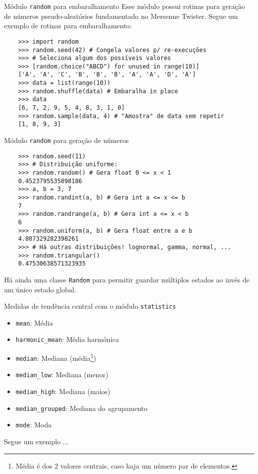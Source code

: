 \documentclass[utf8]{beamer}
\begin{document}
\begin{frame}[fragile]{Módulo \texttt{random} para embaralhamento}
  Esse módulo possui rotinas para geração de números pseudo-aleatórios
  fundamentado no Mersenne Twister.
  Segue um exemplo de rotinas para embaralhamento:

  \begin{verbatim}
    >>> import random
    >>> random.seed(42) # Congela valores p/ re-execuções
    >>> # Seleciona algum dos possíveis valores
    >>> [random.choice("ABCD") for unused in range(10)]
    ['A', 'A', 'C', 'B', 'B', 'B', 'A', 'A', 'D', 'A']
    >>> data = list(range(10))
    >>> random.shuffle(data) # Embaralha in place
    >>> data
    [6, 7, 2, 9, 5, 4, 8, 3, 1, 0]
    >>> random.sample(data, 4) # "Amostra" de data sem repetir
    [1, 8, 9, 3]
  \end{verbatim}

\end{frame}


\begin{frame}[fragile]{Módulo \texttt{random} para geração de números}
  \begin{verbatim}
    >>> random.seed(11)
    >>> # Distribuição uniforme:
    >>> random.random() # Gera float 0 <= x < 1
    0.4523795535098186
    >>> a, b = 3, 7
    >>> random.randint(a, b) # Gera int a <= x <= b
    7
    >>> random.randrange(a, b) # Gera int a <= x < b
    6
    >>> random.uniform(a, b) # Gera float entre a e b
    4.807329282398261
    >>> # Há outras distribuições! lognormal, gamma, normal, ...
    >>> random.triangular()
    0.47530638571323935
  \end{verbatim}

  Há ainda uma classe \texttt{Random} para permitir
  guardar múltiplos estados ao invés de um único estado global.
\end{frame}


\begin{frame}{Medidas de tendência central
              com o módulo \texttt{statistics}}
  \begin{itemize}
    \item \texttt{mean}: Média
    \item \texttt{harmonic_mean}: Média harmônica
    \item \texttt{median}: Mediana (média\footnote{
      Média é dos $2$ valores centrais,
      caso haja um número par de elementos.
    })
    \item \texttt{median_low}: Mediana (menor)
    \item \texttt{median_high}: Mediana (maios)
    \item \texttt{median_grouped}: Mediana do agrupamento
    \item \texttt{mode}: Moda
  \end{itemize}

  Segue um exemplo ...

\end{frame}
\end{document}
